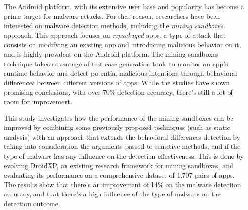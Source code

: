 The Android platform, with its extensive user base and popularity has become a prime target for malware attacks. For that reason, researchers have been interested on malware detection methods, including the \textit{mining sandboxes} approach. This approach focuses on  \textit{repackaged} apps, a type of attack that consists on modifying an existing app and introducing malicious behavior on it, and is highly prevalent on the Android platform. The mining sandboxes technique takes advantage of test case generation tools to monitor an app's runtime behavior and detect potential malicious intentions through behavioral differences between different versions of apps. While the studies have shown promising conclusions, with over 70\% detection accuracy, there's still a lot of room for improvement.

This study investigates how the performance of the mining sandboxes can be improved by combining some previously proposed techniques (such as static analysis) with an approach that extends the behavioral differences detection by taking into consideration the arguments passed to sensitive methods, and if the type of malware has any influence on the detection effectiveness. This is done by evolving DroidXP, an existing research framework for mining sandboxes, and evaluating its performance on a comprehensive dataset of 1,707 pairs of apps. The results show that there's an improvement of 14\% on the malware detection accuracy, and that there's a high influence of the type of malware on the detection outcome.